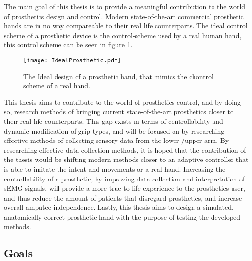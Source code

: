 \documentclass[../main.tex]{subfiles}
\begin{document}
The main goal of this thesis is to provide a meaningful contribution to the world of prosthetics design and control.
Modern state-of-the-art commercial prosthetic hands are in no way compareable to their real life counterparts.
The ideal control scheme of a prosthetic device is the control-scheme used by a real human hand, this control scheme can be seen in figure \ref{fig:idealprosthetic}.

\begin{figure}[h]
\begin{center}
\texttt{[image: IdealProsthetic.pdf]}
\caption{The Ideal design of a prosthetic hand, that mimics the chontrol scheme of a real hand.}
\label{fig:idealprosthetic}
\end{center}
\end{figure}


This thesis aims to contribute to the world of prosthetics control, and by doing so, research methods of bringing current state-of-the-art prosthetics closer to their real life counterparts.
This gap exists in terms of controllability and dynamic modification of grip types, and will be focused on by researching effective methods of collecting sensory data from the lower-/upper-arm.
By researching effective data collection methods, it is hoped that the contribution of the thesis would be shifting modern methods closer to an adaptive controller that is able to imitate the intent and movements or a real hand.
Increasing the controllability of a prosthetic, by improving data collection and interpretation of  sEMG signals, will provide a more true-to-life experience to the prosthetics user, and thus reduce the amount of patients that disregard prosthetics, and increase overall amputee independence.
Lastly, this thesis aims to design a simulated, anatomically correct prosthetic hand with the purpose of testing the developed methods.


\newpage
\subsection{Goals}
\label{sec:goals}
\end{document}
